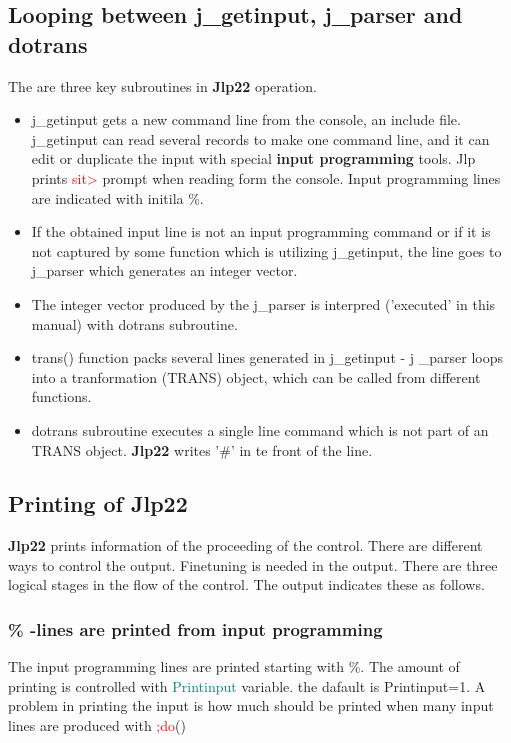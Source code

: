 \subsection{Looping between j\_getinput, j\_parser and dotrans}
\label{basicloop}
The are three key subroutines in \textbf{Jlp22} operation.
\begin{itemize}
\item j\_getinput gets a new command line from the console, an include file. j\_getinput can
read several records to make one command line, and it can edit or duplicate the input
with special \textbf{input programming} tools. Jlp prints \textcolor{Red}{sit>} prompt
when reading form the console. Input programming lines are indicated with initila \%.
\item If the obtained input line is not an input programming command or if it is not
captured by some function which is utilizing j\_getinput, the line goes to j\_parser which
generates an integer vector.
\item The integer vector produced by the j\_parser is interpred ('executed' in this manual)
with dotrans subroutine.
\item \textcolor{VioletRed}{trans}() function packs several lines generated in j\_getinput - j \_parser loops
into a tranformation (TRANS) object, which can be called from different functions.
\item dotrans subroutine executes a single line command which is not part of an TRANS object.
\textbf{Jlp22} writes '\#' in te front of the line.
\end{itemize}
\subsection{Printing of \textbf{Jlp22}}
\label{printing}
\textbf{Jlp22} prints information of the proceeding of the control. There are different ways to control
the output. Finetuning is needed in the output. There are three logical
stages in the flow of the control. The output indicates these as follows.
\subsubsection{\% -lines are printed from input programming}
\label{printinpu}
The input programming lines are printed starting with \%.
The amount of printing is controlled with \textcolor{teal}{Printinput} variable.
the dafault is Printinput=1. A problem in printing the input is how much should be
printed when many input lines are produced with \textcolor{Red}{;do}()
